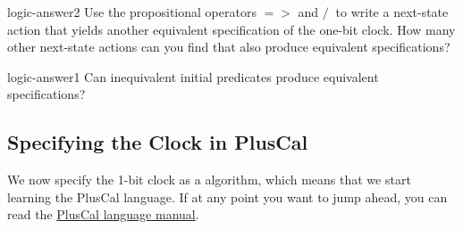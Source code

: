 \documentclass[fleqn,leqno]{article}
\begin{document}
\begin{aquestion}{logic-answer2}
Use the propositional operators $=>$ and $/\ $ to write a
next-state action that yields another equivalent
specification of the one-bit clock.
How many other next-state actions can you find that also
produce equivalent specifications?  
\end{aquestion}

\begin{aquestion}{logic-answer1}
Can inequivalent initial
predicates produce equivalent specifications?
\end{aquestion}
%


% 




\subsection{Specifying the Clock in PlusCal} 

We now specify the 1-bit clock as a  algorithm,
which means that we start learning the PlusCal language.  If at any
point you want to jump ahead, you can read the
   \hyperref{http://research.microsoft.com/en-us/um/people/lamport/tla/c-manual.pdf}{}{}{PlusCal
  language manual}.
\end{document}
